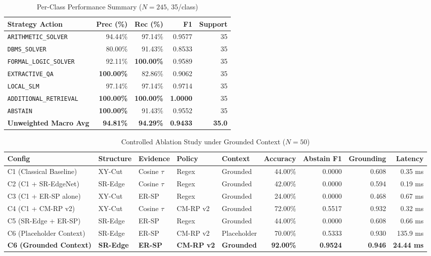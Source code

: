 \documentclass[conference]{IEEEtran}
\begin{document}
\begin{table}[htbp]
\caption{Per-Class Performance Summary ($N = 245$, 35/class)}
\begin{center}
\begin{tabular}{lrrrr}
\toprule
\textbf{Strategy Action} & \textbf{Prec (\%)} & \textbf{Rec (\%)} & \textbf{F1} & \textbf{Support} \\
\midrule
\texttt{ARITHMETIC\_SOLVER} & 94.44\% & 97.14\% & 0.9577 & 35 \\
\texttt{DBMS\_SOLVER} & 80.00\% & 91.43\% & 0.8533 & 35 \\
\texttt{FORMAL\_LOGIC\_SOLVER} & 92.11\% & \textbf{100.00\%} & 0.9589 & 35 \\
\texttt{EXTRACTIVE\_QA} & \textbf{100.00\%} & 82.86\% & 0.9062 & 35 \\
\texttt{LOCAL\_SLM} & 97.14\% & 97.14\% & 0.9714 & 35 \\
\texttt{ADDITIONAL\_RETRIEVAL} & \textbf{100.00\%} & \textbf{100.00\%} & \textbf{1.0000} & 35 \\
\texttt{ABSTAIN} & \textbf{100.00\%} & 91.43\% & 0.9552 & 35 \\
\midrule
\textbf{Unweighted Macro Avg} & \textbf{94.81\%} & \textbf{94.29\%} & \textbf{0.9433} & \textbf{35.0} \\
\bottomrule
\end{tabular}
\end{center}
\end{table}

\begin{table}[htbp]
\caption{Controlled Ablation Study under Grounded Context ($N = 50$)}
\begin{center}
\begin{tabular}{lllllrrrr}
\toprule
\textbf{Config} & \textbf{Structure} & \textbf{Evidence} & \textbf{Policy} & \textbf{Context} & \textbf{Accuracy} & \textbf{Abstain F1} & \textbf{Grounding} & \textbf{Latency} \\
\midrule
C1 (Classical Baseline) & XY-Cut & Cosine $\tau$ & Regex & Grounded & 44.00\% & 0.0000 & 0.608 & 0.35 ms \\
C2 (C1 + SR-EdgeNet) & SR-Edge & Cosine $\tau$ & Regex & Grounded & 42.00\% & 0.0000 & 0.594 & 0.19 ms \\
C3 (C1 + ER-SP alone) & XY-Cut & ER-SP & Regex & Grounded & 24.00\% & 0.0000 & 0.468 & 0.67 ms \\
C4 (C1 + CM-RP v2) & XY-Cut & Cosine $\tau$ & CM-RP v2 & Grounded & 72.00\% & 0.5517 & 0.932 & 0.32 ms \\
C5 (SR-Edge + ER-SP) & SR-Edge & ER-SP & Regex & Grounded & 44.00\% & 0.0000 & 0.608 & 0.66 ms \\
C6 (Placeholder Context) & SR-Edge & ER-SP & CM-RP v2 & Placeholder & 70.00\% & 0.5333 & 0.930 & 135.9 ms \\
\textbf{C6 (Grounded Context)} & \textbf{SR-Edge} & \textbf{ER-SP} & \textbf{CM-RP v2} & \textbf{Grounded} & \textbf{92.00\%} & \textbf{0.9524} & \textbf{0.946} & \textbf{24.44 ms} \\
\bottomrule
\end{tabular}
\end{center}
\end{table}
\end{document}
